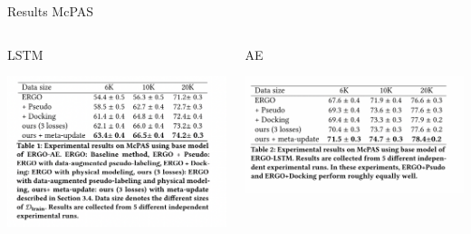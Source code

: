 \documentclass[aspectratio=1610,xcolor={dvipsnames},hyperref={colorlinks,unicode,linkcolor=violet,anchorcolor=blueviolet,citecolor=YellowOrange,filecolor=black,urlcolor=Aquamarine}]{beamer}
\begin{document}
\begin{frame}[label={sec:orgde52991}]{Results McPAS}
\begin{columns}
\begin{column}{0.4\columnwidth}
\begin{block}{LSTM}
\begin{center}
\includegraphics[width=.9\linewidth]{./p4.png}
\end{center}
\end{block}
\end{column}

\begin{column}{0.4\columnwidth}
\begin{block}{AE}
\begin{center}
\includegraphics[width=.9\linewidth]{./p5.png}
\end{center}
\end{block}
\end{column}
\end{columns}
\end{frame}
\end{document}
